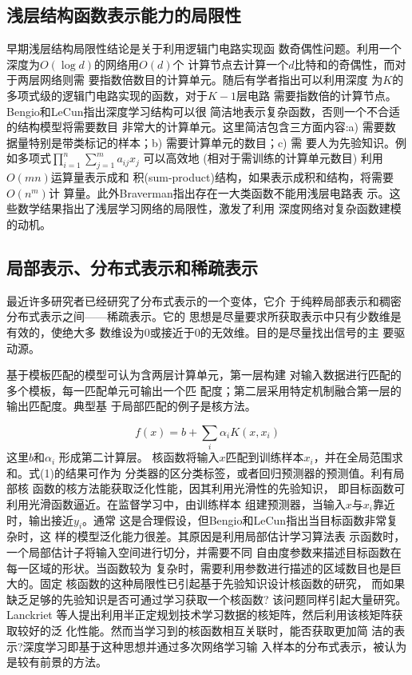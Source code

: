 \documentclass[UTF8]{article}
\begin{document}
	\subsection{浅层结构函数表示能力的局限性} %
	早期浅层结构局限性结论是关于利用逻辑门电路实现函
	数奇偶性问题。利用一个深度为$O(\log d)$的网络用$O(d)$个
	计算节点去计算一个$d$比特和的奇偶性，而对于两层网络则需
	要指数倍数目的计算单元。随后有学者指出可以利用深度
	为$K$的多项式级的逻辑门电路实现的函数，对于$K-1$层电路
	需要指数倍的计算节点。Bengio和LeCun\cite{v10}指出深度学习结构可以很
	简洁地表示复杂函数，否则一个不合适的结构模型将需要数目
	非常大的计算单元。这里简洁包含三方面内容:a) 需要数
	据量特别是带类标记的样本；b) 需要计算单元的数目；c) 需
	要人为先验知识。例如多项式$\prod_{i=1}^n\sum_{j=1}^ma_{ij}x_j$
	可以高效地
	(相对于需训练的计算单元数目) 利用$O(mn)$运算量表示成和
	积(sum-product)结构，如果表示成积和结构，将需要$O(n^m)$计
	算量。此外Braverman\cite{v16}指出存在一大类函数不能用浅层电路表
	示。这些数学结果指出了浅层学习网络的局限性，激发了利用
	深度网络对复杂函数建模的动机。
	\clearpage
	\subsection{局部表示、分布式表示和稀疏表示}
	最近许多研究者已经研究了分布式表示的一个变体，它介
	于纯粹局部表示和稠密分布式表示之间——稀疏表示。它的
	思想是尽量要求所获取表示中只有少数维是有效的，使绝大多
	数维设为0或接近于0的无效维。目的是尽量找出信号的主
	要驱动源。
	
	基于模板匹配的模型可认为含两层计算单元，第一层构建
	对输入数据进行匹配的多个模板，每一匹配单元可输出一个匹
	配度；第二层采用特定机制融合第一层的输出匹配度。典型基
	于局部匹配的例子是核方法。
	
\begin{equation}
	f(x) = b + \sum_{i} \alpha_{i} K(x, x_{i})
	\tag{1}
\end{equation}
	这里$b$和$\alpha_{i}$
	形成第二计算层。
	核函数将输入$x$匹配到训练样本$x_i$，并在全局范围求和。式(1)的结果可作为
	分类器的区分类标签，或者回归预测器的预测值。利有局部核
	函数的核方法能获取泛化性能，因其利用光滑性的先验知识，
	即目标函数可利用光滑函数逼近。在监督学习中，由训练样本
	组建预测器，当输入$x$与$x_i$靠近时，输出接近$y_i$。通常
	这是合理假设，但Bengio和LeCun\cite{v10}指出当目标函数非常复杂时，这
	样的模型泛化能力很差。其原因是利用局部估计学习算法表
	示函数时，一个局部估计子将输入空间进行切分，并需要不同
	自由度参数来描述目标函数在每一区域的形状。当函数较为
	复杂时，需要利用参数进行描述的区域数目也是巨大的。固定
	核函数的这种局限性已引起基于先验知识设计核函数的研究，
	而如果缺乏足够的先验知识是否可通过学习获取一个核函数?
	该问题同样引起大量研究。Lanckriet\cite{v17} 等人提出利用半正定规划技术学习数据的核矩阵，然后利用该核矩阵获取较好的泛
	化性能。然而当学习到的核函数相互关联时，能否获取更加简
	洁的表示?深度学习即基于这种思想并通过多次网络学习输
	入样本的分布式表示，被认为是较有前景的方法。
	
\end{document}
